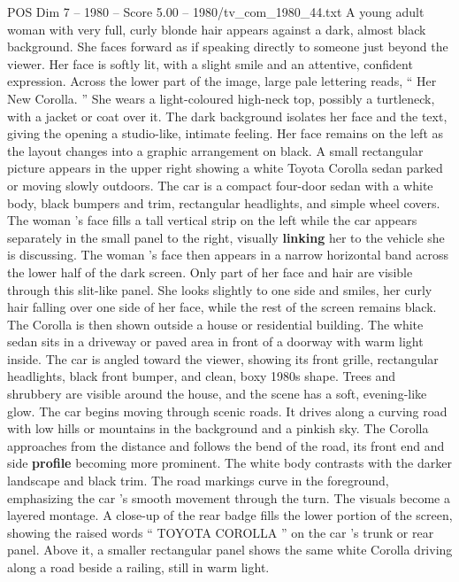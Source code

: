 \begin{textsample}{POS Dim 7 – 1980 – Score 5.00 – 1980/tv\_com\_1980\_44.txt}  \label{ex:f7_pos_048}
A young adult woman with very full, curly blonde hair appears against a dark, almost black background.
She faces forward as if speaking directly to someone just beyond the viewer.
Her face is softly lit, with a slight smile and an attentive, confident expression.
Across the lower part of the image, large pale lettering reads, “ Her New Corolla. ” She wears a light-coloured high-neck top, possibly a turtleneck, with a jacket or coat over it.
The dark background isolates her face and the text, giving the opening a studio-like, intimate feeling.
Her face remains on the left as the layout changes into a graphic arrangement on black.
A small rectangular picture appears in the upper right showing a white Toyota Corolla sedan parked or moving slowly outdoors.
The car is a compact four-door sedan with a white body, black bumpers and trim, rectangular headlights, and simple wheel covers.
The woman ’s face fills a tall vertical strip on the left while the car appears separately in the small panel to the right, visually \textbf{linking} her to the vehicle she is discussing.
The woman ’s face then appears in a narrow horizontal band across the lower half of the dark screen.
Only part of her face and hair are visible through this slit-like panel.
She looks slightly to one side and smiles, her curly hair falling over one side of her face, while the rest of the screen remains black.
The Corolla is then shown outside a house or residential building.
The white sedan sits in a driveway or paved area in front of a doorway with warm light inside.
The car is angled toward the viewer, showing its front grille, rectangular headlights, black front bumper, and clean, boxy 1980s shape.
Trees and shrubbery are visible around the house, and the scene has a soft, evening-like glow.
The car begins moving through scenic roads.
It drives along a curving road with low hills or mountains in the background and a pinkish sky.
The Corolla approaches from the distance and follows the bend of the road, its front end and side \textbf{profile} becoming more prominent.
The white body contrasts with the darker landscape and black trim.
The road markings curve in the foreground, emphasizing the car ’s smooth movement through the turn.
The visuals become a layered montage.
A close-up of the rear badge fills the lower portion of the screen, showing the raised words “ TOYOTA COROLLA ” on the car ’s trunk or rear panel.
Above it, a smaller rectangular panel shows the same white Corolla driving along a road beside a railing, still in warm light.

\end{textsample}
